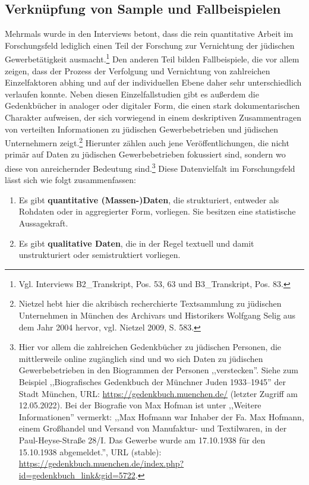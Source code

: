 \subsection{Verknüpfung von Sample und Fallbeispielen}

Mehrmals wurde in den Interviews betont, dass die rein quantitative Arbeit im Forschungsfeld lediglich einen Teil der Forschung zur Vernichtung der jüdischen Gewerbetätigkeit ausmacht.\footnote{Vgl. Interviews B2\_Transkript, Pos. 53, 63 und B3\_Transkript, Pos. 83.} Den anderen Teil bilden Fallbeispiele, die vor allem zeigen, dass der Prozess der Verfolgung und Vernichtung von zahlreichen Einzelfaktoren abhing und auf der individuellen Ebene daher sehr unterschiedlich verlaufen konnte. Neben diesen Einzelfallstudien gibt es außerdem die Gedenkbücher in analoger oder digitaler Form, die einen stark dokumentarischen Charakter aufweisen, der sich vorwiegend in einem deskriptiven Zusammentragen von verteilten Informationen zu jüdischen Gewerbebetrieben und jüdischen Unternehmern zeigt.\footnote{Nietzel hebt hier die akribisch recherchierte Textsammlung zu jüdischen Unternehmen in München des Archivars und Historikers Wolfgang Selig aus dem Jahr 2004 hervor, vgl. Nietzel 2009, S. 583.} Hierunter zählen auch jene Veröffentlichungen, die nicht primär auf Daten zu jüdischen Gewerbebetrieben fokussiert sind, sondern wo diese von anreichernder Bedeutung sind.\footnote{Hier vor allem die zahlreichen Gedenkbücher zu jüdischen Personen, die mittlerweile online zugänglich sind und wo sich Daten zu jüdischen Gewerbebetrieben in den Biogrammen der Personen ,,verstecken''. Siehe zum Beispiel ,,Biografisches Gedenkbuch der Münchner Juden 1933–1945'' der Stadt München, URL: \url{https://gedenkbuch.muenchen.de/} (letzter Zugriff am 12.05.2022). Bei der Biografie von Max Hofman ist unter ,,Weitere Informationen'' vermerkt: ,,Max Hofmann war Inhaber der Fa. Max Hofmann, einem Großhandel und Versand von Manufaktur- und Textilwaren, in der Paul-Heyse-Straße 28/I. Das Gewerbe wurde am 17.10.1938 für den 15.10.1938 abgemeldet.'', URL (stable): \url{https://gedenkbuch.muenchen.de/index.php?id=gedenkbuch_link&gid=5722}.} Diese Datenvielfalt im Forschungsfeld lässt sich wie folgt zusammenfassen: 

\begin{enumerate}
    \item Es gibt \textbf{quantitative (Massen-)Daten}, die strukturiert, entweder als Rohdaten oder in aggregierter Form, vorliegen. Sie besitzen eine statistische Aussagekraft.
    \item Es gibt \textbf{qualitative Daten}, die in der Regel textuell und damit unstrukturiert oder semistruktiert vorliegen.
\end{enumerate}

